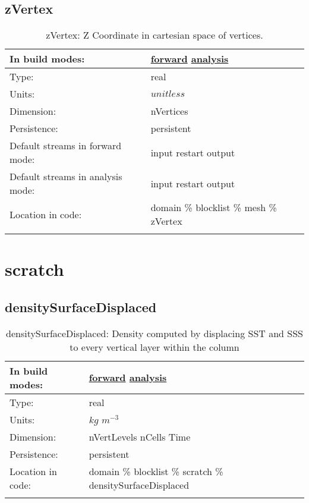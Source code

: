 \subsection[zVertex]{zVertex}
\label{subsec:var_sec_mesh_zVertex}
\begin{center}
\begin{longtable}{| p{2.0in} | p{4.0in} |}
        \hline 
        In build modes: & \hyperref[subsec:forward_var_tab_mesh]{forward} \hyperref[subsec:analysis_var_tab_mesh]{analysis} \\
        \hline 
        Type: & real \\
        \hline 
        Units: & $unitless$ \\
        \hline 
        Dimension: & nVertices \\
        \hline 
        Persistence: & persistent \\
        \hline 
		 Default streams in forward mode: &  input restart output \\
        \hline 
		 Default streams in analysis mode: &  input restart output \\
        \hline 
		 Location in code: & domain \% blocklist \% mesh \% zVertex \\
		 \hline 
    \caption{zVertex: Z Coordinate in cartesian space of vertices.}
\end{longtable}
\end{center}
\section[scratch]{scratch}
\label{sec:var_sec_scratch}
\subsection[densitySurfaceDisplaced]{densitySurfaceDisplaced}
\label{subsec:var_sec_scratch_densitySurfaceDisplaced}
\begin{center}
\begin{longtable}{| p{2.0in} | p{4.0in} |}
        \hline 
        In build modes: & \hyperref[subsec:forward_var_tab_scratch]{forward} \hyperref[subsec:analysis_var_tab_scratch]{analysis} \\
        \hline 
        Type: & real \\
        \hline 
        Units: & $kg$ $m^{-3}$ \\
        \hline 
        Dimension: & nVertLevels nCells Time \\
        \hline 
        Persistence: & persistent \\
        \hline 
		 Location in code: & domain \% blocklist \% scratch \% densitySurfaceDisplaced \\
		 \hline 
    \caption{densitySurfaceDisplaced: Density computed by displacing SST and SSS to every vertical layer within the column}
\end{longtable}
\end{center}
